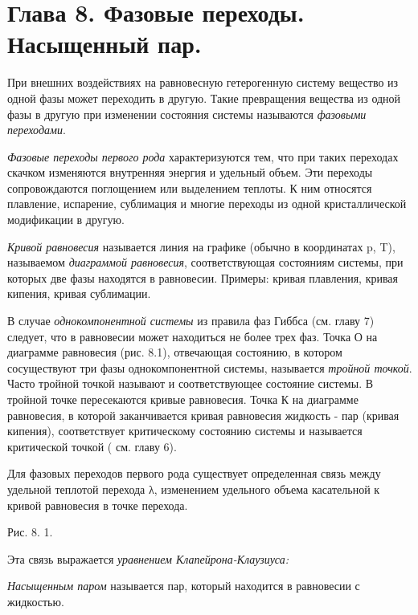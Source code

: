 \chapter{Глава 8. Фазовые переходы. Насыщенный пар.}

При внешних воздействиях на равновесную гетерогенную систему вещество из
одной фазы может переходить в другую. Такие превращения вещества из
одной фазы в другую при изменении состояния системы называются
\emph{фазовыми переходами}.

\emph{Фазовые переходы первого рода} характеризуются тем, что при таких
переходах скачком изменяются внутренняя энергия и удельный объем. Эти
переходы сопровождаются поглощением или выделением теплоты. К ним
относятся плавление, испарение, сублимация и многие переходы из одной
кристаллической модификации в другую.

\emph{Кривой равновесия} называется линия на графике (обычно в
координатах p, T), называемом \emph{диаграммой равновесия},
соответствующая состояниям системы, при которых две фазы находятся в
равновесии. Примеры: кривая плавления, кривая кипения, кривая
сублимации.

В случае \emph{однокомпонентной системы} из правила фаз Гиббса (см.
главу 7) следует, что в равновесии может находиться не более трех фаз.
Точка О на диаграмме равновесия (рис. 8.1), отвечающая состоянию, в
котором сосуществуют три фазы однокомпонентной системы, называется
\emph{тройной точкой}. Часто тройной точкой называют и соответствующее
состояние системы. В тройной точке пересекаются кривые равновесия. Точка
К на диаграмме равновесия, в которой заканчивается кривая равновесия
жидкость - пар (кривая кипения), соответствует критическому состоянию
системы и называется критической точкой ( см. главу 6).

Для фазовых переходов первого рода существует определенная связь между
удельной теплотой перехода λ, изменением удельного объема
касательной к кривой равновесия в точке перехода.


Рис. 8. 1.

Эта связь выражается \emph{уравнением Клапейрона-Клаузиуса:}


\emph{Насыщенным паром} называется пар, который находится в равновесии с
жидкостью.

